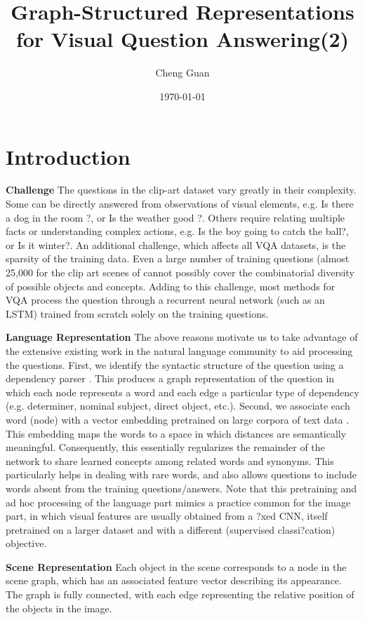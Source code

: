 \documentclass[a4paper,twocolumn]{article}
\title{Graph-Structured Representations for Visual Question Answering(2)}
\author{Cheng Guan}
\date{\today}
\begin{document}
\maketitle

\section{Introduction}
\textbf{Challenge}
The questions in the clip-art dataset vary greatly in their complexity. Some can be directly answered from observations of visual elements, e.g. Is there a dog in the room ?, or Is the weather good ?. Others require relating multiple facts or understanding complex actions, e.g. Is the boy going to catch the ball?, or Is it winter?. An additional challenge, which affects all VQA datasets, is the sparsity of the training data. Even a large number of training questions (almost 25,000 for the clip art scenes of \cite{c1} cannot possibly cover the combinatorial diversity of possible objects and concepts. Adding to this challenge, most methods for VQA process the question through a recurrent neural network (such as an LSTM) trained from scratch solely on the training questions.

\textbf{Language Representation}
The above reasons motivate us to take advantage of the extensive existing work in the natural language community to aid processing the questions. First, we identify the syntactic structure of the question using a dependency parser \cite{c2}. This produces a graph representation of the question in which each node represents a word and each edge a particular type of dependency (e.g. determiner, nominal subject, direct object, etc.). Second, we associate each word (node) with a vector embedding pretrained on large corpora of text data \cite{c3}. This embedding maps the words to a space in which distances are semantically meaningful. Consequently, this essentially regularizes the remainder of the network to share learned concepts among related words and synonyms. This particularly helps in dealing with rare words, and also allows questions to include words absent from the training questions/answers. Note that this pretraining and ad hoc processing of the language part mimics a practice common for the image part, in which visual features are usually obtained from a ?xed CNN, itself pretrained on a larger dataset and with a different (supervised classi?cation) objective.

\textbf{Scene Representation}
Each object in the scene corresponds to a node in the scene graph, which has an associated feature vector describing its appearance. The graph is fully connected, with each edge representing the relative position of the objects in the image.
\end{document}
